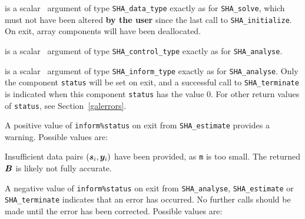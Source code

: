 \documentclass{galahad}
\newcommand{\packagename}{SHA}
\begin{document}
\vspace*{-1mm}
\begin{description}

 is a scalar \intentinout\ argument of type
{\tt \packagename\_data\_type}
exactly as for
{\tt \packagename\_solve},
which must not have been altered {\bf by the user} since the last call to
{\tt \packagename\_initialize}.
On exit, array components will have been deallocated.

 is a scalar \intentin\ argument of type
{\tt \packagename\_control\_type}
exactly as for
{\tt \packagename\_analyse}.

 is a scalar \intentout\ argument of type
{\tt \packagename\_inform\_type}
exactly as for
{\tt \packagename\_analyse}.
Only the component {\tt status} will be set on exit, and a
successful call to
{\tt \packagename\_terminate}
is indicated when this  component {\tt status} has the value 0.
For other return values of {\tt status}, see Section~\ref{galerrors}.

\end{description}


\galerrors
A positive value of {\tt inform\%status} on exit from
{\tt \packagename\_estimate}
provides a warning. Possible values are:

\begin{description}
 Insufficient data pairs $({\bm{s}}_i,{\bm{y}}_i)$ have been provided, as
{\tt m} is too small. The returned ${\bm{B}}$ is likely not fully accurate.
\end{description}

A negative value of {\tt inform\%status} on exit from
{\tt \packagename\_analyse},
{\tt \packagename\_estimate}
or
{\tt \packagename\_terminate}
indicates that an error has occurred. No further calls should be made
until the error has been corrected. Possible values are:
\end{document}
